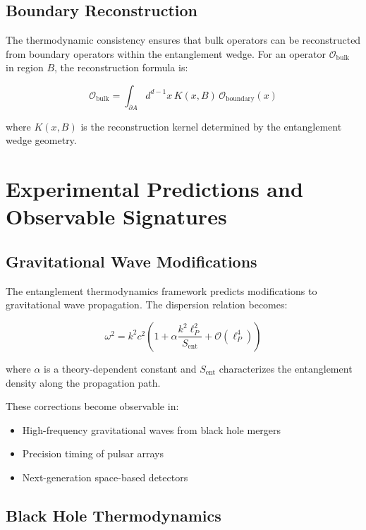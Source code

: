 \documentclass[twocolumn,showpacs,preprintnumbers,amsmath,amssymb,aps]{revtex4-1}
\begin{document}
\subsection{Boundary Reconstruction}

The thermodynamic consistency ensures that bulk operators can be reconstructed from boundary operators within the entanglement wedge. For an operator $\mathcal{O}_{\text{bulk}}$ in region $B$, the reconstruction formula is:

\begin{equation}
\mathcal{O}_{\text{bulk}} = \int_{\partial A} d^{d-1}x \, K(x,B) \, \mathcal{O}_{\text{boundary}}(x)
\label{eq:reconstruction}
\end{equation}

where $K(x,B)$ is the reconstruction kernel determined by the entanglement wedge geometry.

\section{Experimental Predictions and Observable Signatures}

\subsection{Gravitational Wave Modifications}

The entanglement thermodynamics framework predicts modifications to gravitational wave propagation. The dispersion relation becomes:

\begin{equation}
\omega^2 = k^2 c^2 \left(1 + \alpha \frac{k^2 \ell_P^2}{S_{\text{ent}}} + \mathcal{O}(\ell_P^4)\right)
\label{eq:modified_dispersion}
\end{equation}

where $\alpha$ is a theory-dependent constant and $S_{\text{ent}}$ characterizes the entanglement density along the propagation path.

These corrections become observable in:
\begin{itemize}
\item High-frequency gravitational waves from black hole mergers
\item Precision timing of pulsar arrays
\item Next-generation space-based detectors
\end{itemize}

\subsection{Black Hole Thermodynamics}
\end{document}

